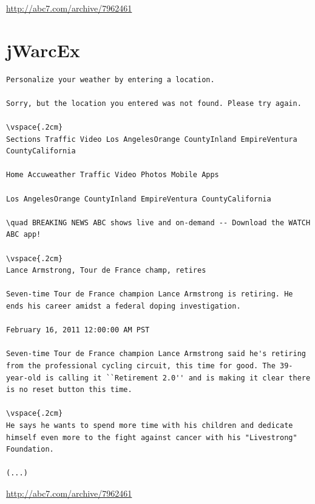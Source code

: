 \documentclass[a4paper,12pt,titlepage=false]{scrreprt}
\begin{document}
\vspace{.2cm}
\url{http://abc7.com/archive/7962461}

\section{jWarcEx}

\begin{lstlisting}[breaklines=true]
Personalize your weather by entering a location.

Sorry, but the location you entered was not found. Please try again.

\vspace{.2cm}
Sections Traffic Video Los AngelesOrange CountyInland EmpireVentura CountyCalifornia

Home Accuweather Traffic Video Photos Mobile Apps

Los AngelesOrange CountyInland EmpireVentura CountyCalifornia

\quad BREAKING NEWS ABC shows live and on-demand -- Download the WATCH ABC app!

\vspace{.2cm}
Lance Armstrong, Tour de France champ, retires

Seven-time Tour de France champion Lance Armstrong is retiring. He ends his career amidst a federal doping investigation.

February 16, 2011 12:00:00 AM PST

Seven-time Tour de France champion Lance Armstrong said he's retiring from the professional cycling circuit, this time for good. The 39-year-old is calling it ``Retirement 2.0'' and is making it clear there is no reset button this time.

\vspace{.2cm}
He says he wants to spend more time with his children and dedicate himself even more to the fight against cancer with his "Livestrong" Foundation.

(...)
\end{lstlisting}

\vspace{.2cm}
\url{http://abc7.com/archive/7962461}
\end{document}
